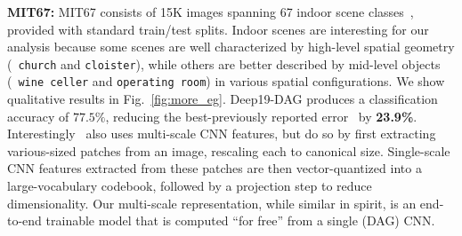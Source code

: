 \documentclass[10pt,twocolumn,letterpaper]{article}
\begin{document}

{\bf MIT67:} MIT67 consists of 15K images spanning 67 indoor scene classes~\cite{MIT67}, provided with standard train/test splits. Indoor scenes are interesting for our analysis because some scenes are well characterized by high-level spatial geometry (\eg~{\tt church} and {\tt cloister}), while others are better described by mid-level objects (\eg~{\tt wine celler} and {\tt operating room}) in various spatial configurations. We show qualitative results in Fig.~\ref{fig:more_eg}. Deep19-DAG produces a classification accuracy of $77.5\%$, reducing the best-previously reported error~\cite{Gong14} by {\bf 23.9\%}. Interestingly~\cite{Gong14} also uses multi-scale CNN features, but do so by first extracting various-sized patches from an image, rescaling each to canonical size. Single-scale CNN features extracted from these patches are then vector-quantized into a large-vocabulary codebook, followed by a projection step to reduce dimensionality. Our multi-scale representation, while similar in spirit, is an end-to-end trainable model that is computed ``for free'' from a single (DAG) CNN.



\end{document}
